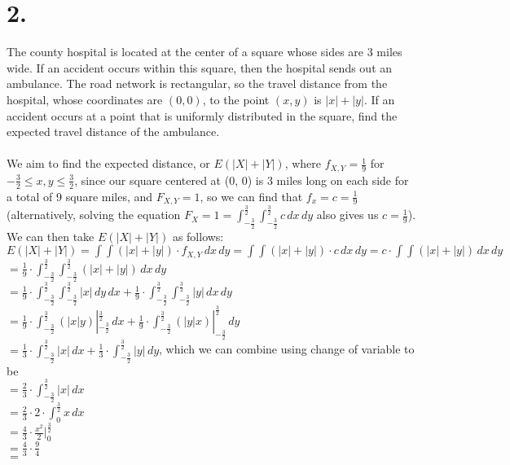 \documentclass{article}
\begin{document}
\section*{2.}
{\Large

The county hospital is located at the center of a square
whose sides are $3$ miles wide. If an accident occurs within this
square, then the hospital sends out an ambulance. The road network
is rectangular, so the travel distance from the hospital, whose coordinates
are $(0,0)$, to the point $(x,y)$ is $|x|+|y|$. If an accident
occurs at a point that is uniformly distributed in the square, find
the expected travel distance of the ambulance. \\ \\ 
We aim to find the expected distance, or $E(|X| + |Y|)$, where $f_{X, Y} = \frac{1}{9}$ for $-\frac{3}{2} \leq x,y \leq \frac{3}{2}$, since our square centered at (0, 0) is 3 miles long on each side for a total of 9 square miles, and $F_{X, Y} = 1$, so we can find that $f_x = c = \frac{1}{9}$ (alternatively, solving the equation $F_X = 1 = \int_{-\frac{3}{2}}^{\frac{3}{2}} \int_{-\frac{3}{2}}^{\frac{3}{2}} c \,dx \,dy $ also gives us $c = \frac{1}{9}$). We can then take $E(|X| + |Y|)$ as follows: \\
$E(|X| + |Y|) = \int \int (|x| + |y|) \cdot f_{X, Y} \,dx \,dy = \int \int (|x| + |y|) \cdot c \,dx \,dy = c \cdot \int \int (|x| + |y|) \,dx \,dy$ \\
$ = \frac{1}{9} \cdot \int_{-\frac{3}{2}}^{\frac{3}{2}} \int_{-\frac{3}{2}}^{\frac{3}{2}} (|x| + |y|) \,dx \,dy$ \\ 
$ = \frac{1}{9} \cdot \int_{-\frac{3}{2}}^{\frac{3}{2}} \int_{-\frac{3}{2}}^{\frac{3}{2}} |x| \,dy \,dx + \frac{1}{9} \cdot \int_{-\frac{3}{2}}^{\frac{3}{2}} \int_{-\frac{3}{2}}^{\frac{3}{2}} |y| \,dx \,dy$ \\ 
$ = \frac{1}{9} \cdot \int_{-\frac{3}{2}}^{\frac{3}{2}} (|x|y) |_{-\frac{3}{2}}^{\frac{3}{2}} \,dx + \frac{1}{9} \cdot \int_{-\frac{3}{2}}^{\frac{3}{2}} (|y|x) |_{-\frac{3}{2}}^{\frac{3}{2}} \,dy$ \\ 
$ = \frac{1}{3} \cdot \int_{-\frac{3}{2}}^{\frac{3}{2}} |x| \,dx + \frac{1}{3} \cdot \int_{-\frac{3}{2}}^{\frac{3}{2}} |y| \,dy$, which we can combine using change of variable to be \\ 
$ = \frac{2}{3} \cdot \int_{-\frac{3}{2}}^{\frac{3}{2}} |x| \,dx$ \\ 
$ = \frac{2}{3} \cdot 2 \cdot \int_{0}^{\frac{3}{2}} x \,dx$ \\
$ = \frac{4}{3} \cdot \frac{x^2}{2} |_{0}^{\frac{3}{2}}$ \\
$ = \frac{4}{3} \cdot \frac{9}{4}$ \\
$ = $  \\

}
\end{document}
